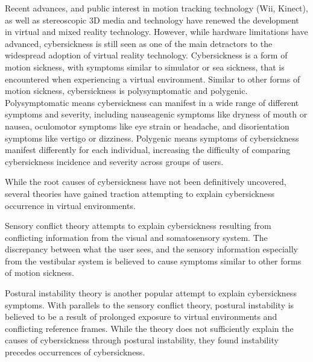Recent advances, and public interest in motion tracking technology (Wii\textcopyright, Kinect\textcopyright), as well
as stereoscopic 3D media and technology have renewed the development in virtual and mixed reality technology.
However, while hardware limitations have advanced, cybersickness is still seen as one of the main detractors to the
widespread adoption of virtual reality technology.
Cybersickness is a form of motion sickness, with symptoms similar to simulator or sea sickness, that is encountered
when experiencing a virtual environment.
Similar to other forms of motion sickness, cybersickness is polysymptomatic and polygenic.
Polysymptomatic means cybersickness can manifest in a wide range of different symptoms and severity, including
nauseagenic symptoms like dryness of mouth or nausea, oculomotor symptoms like eye strain or headache, and
disorientation symptoms like vertigo or dizziness.
Polygenic means symptoms of cybersickness manifest differently for each individual, increasing the difficulty of
comparing cybersickness incidence and severity across groups of users.

While the root causes of cybersickness have not been definitively uncovered, several theories have gained traction
attempting to explain cybersickness occurrence in virtual environments.

Sensory conflict theory attempts to explain cybersickness resulting from conflicting information from the visual and
somatosensory system.
The discrepancy between what the user sees, and the sensory information especially from the vestibular system is
believed to cause symptoms similar to other forms of motion sickness.

Postural instability theory is another popular attempt to explain cybersickness symptoms.
With parallels to the sensory conflict theory, postural instability is believed to be a result of prolonged exposure
to virtual environments and conflicting reference frames.
While the theory does not sufficiently explain the causes of cybersickness through postural instability, they found
instability precedes occurrences of cybersickness.

